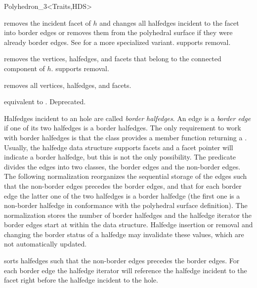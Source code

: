 \begin{ccClassTemplate}{Polyhedron_3<Traits,HDS>}

    {removes the incident facet of $h$ and changes all halfedges incident 
     to the facet into border edges or removes them from the
     polyhedral surface if they were already border edges.
     See  for a more specialized variant.    
     \ccPrecond {} supports removal.}

    {removes the  vertices, halfedges, and facets that belong to the 
     connected component of $h$. \ccPrecond {} supports removal.}

    {removes all vertices, halfedges, and facets.}

    {equivalent to . Deprecated.}



\begin{ccAdvanced}
  
Halfedges incident to an hole are called {\em border halfedges}. An
edge is a {\em border edge\/} if one of its two halfedges is a border
halfedges. The only requirement to work with border halfedges is
that the  class provides a member function
 returning a . Usually, the halfedge data
structure supports facets and a  facet pointer will
indicate a border halfedge, but this is not the only possibility.
The  predicate divides the edges into two classes,
the border edges and the non-border edges. The following
normalization reorganizes the sequential storage of the edges such
that the non-border edges precedes the border edges, and that for
each border edge the latter one of the two halfedges is a border
halfedge (the first one is a non-border halfedge in conformance with
the polyhedral surface definition). The normalization stores the
number of border halfedges and the halfedge iterator the border
edges start at within the data structure.  Halfedge insertion or
removal and changing the border status of a halfedge may invalidate
these values, which are not automatically updated.


    {sorts halfedges such that the non-border edges precedes the
     border edges. For each border edge the halfedge iterator will
    reference the halfedge incident to the facet right before the
    halfedge incident to the hole.} 


\end{ccAdvanced}
\end{ccClassTemplate}
